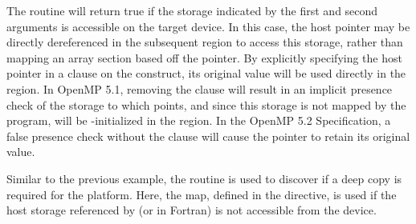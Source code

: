 The  routine will return true if the storage indicated 
by the first and second arguments is accessible on the target device. In this case, 
the host pointer  may be directly dereferenced in the subsequent 
 region to access this storage, rather than mapping an array section based 
off the pointer. By explicitly specifying the host pointer in a  
clause on the construct, its original value will be used directly in the  region. 
In OpenMP 5.1, removing the  clause will result in an implicit presence 
check of the storage to which  points, and since this storage is not mapped by the 
program,  will be -initialized in the  region. 
In the OpenMP 5.2 Specification, a false presence check without 
the  clause will cause the pointer to retain its original value. 


Similar to the previous example, the  routine is used to
discover if a deep copy is required for the platform.  Here, the  map,
defined in the  directive, is used if the host storage referenced by 
 (or  in Fortran) is not accessible from the device.

